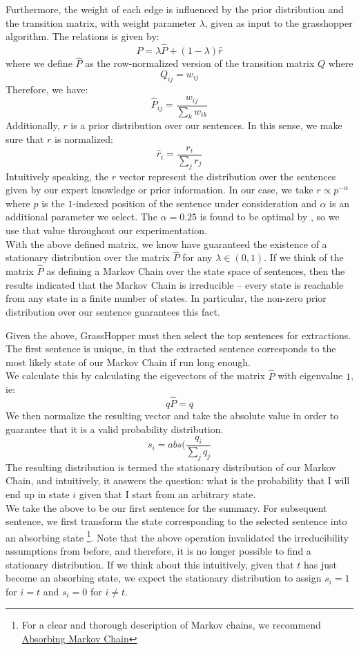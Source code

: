 \documentclass[10pt]{article}
\begin{document}
Furthermore, the weight of each edge is influenced by the prior distribution  and the transition matrix, with weight parameter $\lambda$, given as input to the grasshopper algorithm. The relations is given by:
$$
P = \lambda \hat{P} + (1-\lambda)\hat{r}
$$
where we define $\hat{P}$ as the row-normalized version of the transition matrix $Q$ where
$$
Q_{ij} = w_{ij}
$$
Therefore, we have:
$$
\hat{P}_{ij} = \frac{w_{ij}}{\sum_k w_{ik}}
$$
Additionally, $r$ is a prior distribution over our sentences. In this sense, we make sure that $r$ is normalized:
$$
\hat{r}_i = \frac{r_i}{\sum_j r_j}
$$
Intuitively speaking, the $r$ vector represent the distribution over the sentences given by our expert knowledge or prior information. In our case, we take $r \propto p^{-\alpha}$ where $p$ is the $1$-indexed position of the sentence under consideration and $\alpha$ is an additional parameter we select. The $\alpha = 0.25$ is found to be optimal by \cite{grasshopper}, so we use that value throughout our experimentation. \\

With the above defined matrix, we know have guaranteed the existence of a stationary distribution over the matrix $\hat{P}$ for any $\lambda \in (0,1)$. If we think of the matrix $\hat{P}$ as defining a Markov Chain over the state space of sentences, then the results indicated that the Markov Chain is irreducible -- every state is reachable from any state in a finite number of states. In particular, the non-zero prior distribution over our sentence guarantees this fact.

Given the above, {\sc GrassHopper} must then select the top sentences for extractions. The first sentence is unique, in that the extracted sentence corresponds to the most likely state of our Markov Chain if run long enough.\\

We calculate this by calculating the eigevectors of the matrix $\hat{P}$ with eigenvalue $1$, ie:
$$
q\hat{P} = q
$$
We then normalize the resulting vector and take the absolute value in order to guarantee that it is a valid probability distribution.
$$
s_i = abs(\frac{q_i}{\sum_j q_j}
$$
The resulting distribution is termed the stationary distribution of our Markov Chain, and intuitively, it answers the question: what is the probability that I will end up in state $i$ given that I start from an arbitrary state.\\

We take the above to be our first sentence for the summary. For subsequent sentence, we first transform the state corresponding to the selected sentence into an absorbing state \footnote{For a clear and thorough description of Markov chains, we recommend \href{https://en.wikipedia.org/wiki/Absorbing_Markov_chain}{Absorbing Markov Chain}}. Note that the above operation invalidated the irreducibility assumptions from before, and therefore, it is no longer possible to find a stationary distribution. If we think about this intuitively, given that $t$ has just become an absorbing state, we expect the stationary distribution to assign $s_i = 1 $ for $i =t$ and $s_i = 0$ for $i \neq t$. \\
\end{document}
